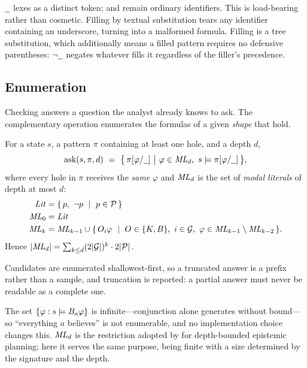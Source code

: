 \documentclass[11pt,a4paper]{article}
\begin{document}
\begin{remark}
$\hole$ lexes as a distinct token;  and  remain ordinary identifiers.
This is load-bearing rather than cosmetic. Filling by textual substitution tears any
identifier containing an underscore, turning  into a malformed formula.
Filling is a tree substitution, which additionally means a filled pattern requires no
defensive parentheses: $\neg\hole$ negates whatever fills it regardless of the filler's
precedence.
\end{remark}

\subsection{Enumeration}
\label{sec:enumeration}

Checking answers a question the analyst already knows to ask. The complementary operation
enumerates the formulas of a given \emph{shape} that hold.

\begin{definition}[Ask]
\label{def:ask}
For a state $s$, a pattern $\pi$ containing at least one hole, and a depth $d$,
\[
  \mathrm{ask}(s, \pi, d) \ =\ \big\{\, \pi[\varphi/\hole] \ \big|\
    \varphi \in \ML_{d},\ s \models \pi[\varphi/\hole] \,\big\},
\]
where every hole in $\pi$ receives the \emph{same} $\varphi$ and $\mathit{ML}_d$ is the set of
\emph{modal literals} of depth at most $d$:
\begin{align}
  \mathit{Lit} &= \{\, p,\ \neg p \ \mid\ p \in \mathcal{P} \,\} \\
  \mathit{ML}_{0} &= \mathit{Lit} \\
  \mathit{ML}_{k} &= \mathit{ML}_{k-1} \cup \{\, O_i \varphi \ \mid\ O \in \{K, B\},\ i \in \mathcal{G},\
     \varphi \in \mathit{ML}_{k-1} \setminus \mathit{ML}_{k-2} \,\} .
\end{align}
Hence $|\mathit{ML}_{d}| = \sum_{k \le d} (2|\mathcal{G}|)^{k} \cdot 2|\mathcal{P}|$.
\end{definition}

Candidates are enumerated shallowest-first, so a truncated answer is a prefix rather than a
sample, and truncation is reported: a partial answer must never be readable as a complete one.

\begin{remark}
The set $\{\varphi : s \models B_{a}\varphi\}$ is infinite---conjunction alone generates
without bound---so ``everything $a$ believes'' is not enumerable, and no implementation choice
changes this. $\mathit{ML}_d$ is the restriction adopted by \citet{muise2015} for depth-bounded
epistemic planning; here it serves the same purpose, being finite with a size determined by
the signature and the depth.
\end{remark}
\end{document}
